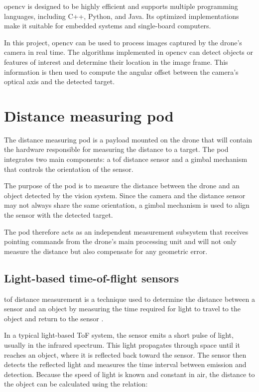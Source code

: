 \gls{opencv} is designed to be highly efficient and supports multiple programming languages,
including C++, Python, and Java. Its optimized implementations make it suitable for embedded
systems and single-board computers.

In this project, \gls{opencv} can be used to process images captured by the drone's camera
in real time. The algorithms implemented in \gls{opencv} can detect objects or features of
interest and determine their location in the image frame. This information is then used to
compute the angular offset between the camera's optical axis and the detected target.

\section{Distance measuring pod}

The distance measuring pod is a payload mounted on the drone that will contain the hardware
responsible for measuring the distance to a target. The pod integrates two main components:
a \gls{tof} distance sensor and a gimbal mechanism that controls the orientation of the sensor.

The purpose of the pod is to measure the distance between the drone and an object detected
by the vision system. Since the camera and the distance sensor may not always share the
same orientation, a gimbal mechanism is used to align the sensor with the detected target.

The pod therefore acts as an independent measurement subsystem that receives pointing
commands from the drone's main processing unit and will not only measure the distance
but also compensate for any geometric error.

\subsection{Light-based time-of-flight sensors}

\gls{tof} distance measurement is a technique used to determine the distance between a sensor
and an object by measuring the time required for light to travel to the object and return to
the sensor \cite{tof1}.

In a typical light-based ToF system, the sensor emits a short pulse of light, usually in
the infrared spectrum. This light propagates through space until it reaches an object,
where it is reflected back toward the sensor. The sensor then detects the reflected light
and measures the time interval between emission and detection. Because the speed
of light is known and constant in air, the distance to the object can be calculated using
the relation:

